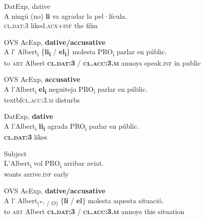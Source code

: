 \documentclass[output=paper,colorlinks,citecolor=brown,nonflat]{./langscibook}
\begin{document}
 \ex  DatExp, {dative} \label{ex:royo:11c}\\
 \gll  A ningú (no) \textbf{li} va agradar la pel·lícula. \\
  \textsc{cl.dat:3} liked.\textsc{aux+inf} the film\\
\glt {}

 
 
  \z
  \z


\ea%
 \label{ex:royo:12}
 \ea OVS AcExp, \textbf{dative/accusative} \label{ex:royo:12a}\\
 \gll  A l’ Albert\textsubscript{i} \{\textbf{li\textsubscript{i}} / \textbf{el\textsubscript{i}}\} molesta PRO\textsubscript{i} parlar en públic.\\
 to \textsc{art} Albert \textbf{\textsc{cl.dat:3}} / \textbf{\textsc{cl.acc:3.m}} annoys speak.\textsc{inf} in public\\
\glt {}
 
 \ex OVS AcExp, \textbf{accusative}\label{ex:royo:12b}\\
 \gll A l’Albert\textsubscript{i} \textbf{el\textsubscript{i}} neguiteja PRO\textsubscript{i} parlar en públic.\\
  textbf{\textsc{cl.acc:3.m}} disturbs\\
\glt {}
 
 \ex DatExp, \textbf{dative}\label{ex:royo:12c}\\
 \gll A l’Albert\textsubscript{i} \textbf{li\textsubscript{i}} agrada PRO\textsubscript{i} parlar en públic.\\
   \textbf{\textsc{cl.dat:3}} likes\\
\glt {}
 
 \ex Subject\label{ex:royo:12d}\\
 \gll L’Albert\textsubscript{i} vol PRO\textsubscript{i} arribar aviat.\\
  wants arrive.\textsc{inf} early\\
\glt {}
 
 \z
 \z


 
\ea%
 \label{ex:royo:13}
 \ea OVS AcExp, \textbf{dative/accusative}\label{ex:royo:13a}\\
 \gll A l’ Albert\textsubscript{(*}, \textsubscript{/ Ø)} \{\textbf{li} / \textbf{el}\} molesta aquesta situació.\\
 to \textsc{art} Albert \textbf{\textsc{cl.dat:3}} / \textbf{\textsc{cl.acc:3.m}} annoys this situation\\
\glt {}
 
\end{document}
